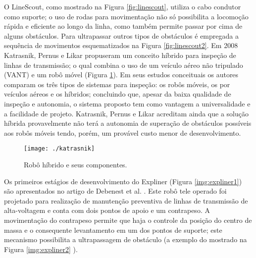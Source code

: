 O LineScout, como mostrado na Figura \ref{fig:linescout}, utiliza o cabo condutor como suporte; o uso de rodas para movimentação não só possibilita a locomoção rápida e eficiente ao longo da linha, como também permite passar por cima de alguns obstáculos. Para ultrapassar outros tipos de obstáculos é empregada a sequência de movimentos esquematizados na Figura \ref{fig:linescout2}.
Em 2008 Katrasnik, Pernus e Likar \cite{katrasnik2010climbing} propuseram um conceito híbrido para inspeção de linhas de transmissão; o qual combina o uso de um veículo aéreo não tripulado (VANT) e um robô móvel (Figura \ref{img:katrasnik}). Em seus estudos conceituais os autores comparam os três tipos de sistemas para inspeção: os robôs móveis, os por veículos aéreos e os híbridos; concluindo que, apesar da baixa qualidade de inspeção e autonomia, o sistema proposto tem como vantagem a universalidade e a facilidade de projeto.  Katrasnik, Pernus e Likar \cite{katrasnik2010climbing} acreditam ainda que a solução híbrida provavelmente não terá a autonomia de superação de obstáculos possíveis aos robôs móveis tendo, porém, um provável custo menor de desenvolvimento.  

\begin{figure}[h!]	
	\caption{Robô híbrido e seus componentes.}
	\label{img:katrasnik}											 
	\centering													 
	\texttt{[image: ./katrasnik]}
\end{figure}													 

Os primeiros estágios de desenvolvimento do Expliner (Figura \ref{img:expliner1}) são apresentados no artigo de Debenest et al. \cite{debenest2008expliner}. Este robô tele operado foi projetado para realização de manutenção preventiva de linhas de transmissão de alta-voltagem e conta com dois pontos de apoio e um contrapeso.  A movimentação do contrapeso permite que haja o controle da posição do centro de massa e o consequente levantamento em um dos pontos de suporte; este mecanismo possibilita a ultrapassagem de obstáculo (a exemplo do mostrado na Figura \ref{img:expliner2} ).

